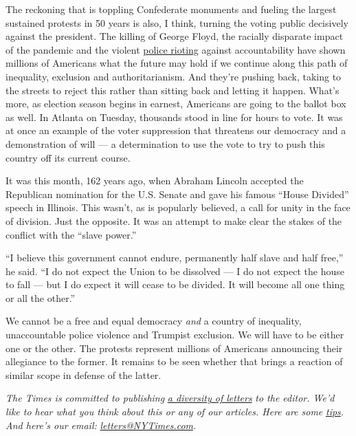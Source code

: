 The reckoning that is toppling Confederate monuments and fueling the
largest sustained protests in 50 years is also, I think, turning the
voting public decisively against the president. The killing of George
Floyd, the racially disparate impact of the pandemic and the violent
\href{https://www.nytimes3xbfgragh.onion/2020/06/05/opinion/sunday/police-riots.html}{police
rioting} against accountability have shown millions of Americans what
the future may hold if we continue along this path of inequality,
exclusion and authoritarianism. And they're pushing back, taking to the
streets to reject this rather than sitting back and letting it happen.
What's more, as election season begins in earnest, Americans are going
to the ballot box as well. In Atlanta on Tuesday, thousands stood in
line for hours to vote. It was at once an example of the voter
suppression that threatens our democracy and a demonstration of will ---
a determination to use the vote to try to push this country off its
current course.

It was this month, 162 years ago, when Abraham Lincoln accepted the
Republican nomination for the U.S. Senate and gave his famous ``House
Divided'' speech in Illinois. This wasn't, as is popularly believed, a
call for unity in the face of division. Just the opposite. It was an
attempt to make clear the stakes of the conflict with the ``slave
power.''

``I believe this government cannot endure, permanently half slave and
half free,'' he said. ``I do not expect the Union to be dissolved --- I
do not expect the house to fall --- but I do expect it will cease to be
divided. It will become all one thing or all the other.''

We cannot be a free and equal democracy \emph{and} a country of
inequality, unaccountable police violence and Trumpist exclusion. We
will have to be either one or the other. The protests represent millions
of Americans announcing their allegiance to the former. It remains to be
seen whether that brings a reaction of similar scope in defense of the
latter.

\emph{The Times is committed to publishing}
\href{https://www.nytimes3xbfgragh.onion/2019/01/31/opinion/letters/letters-to-editor-new-york-times-women.html}{\emph{a
diversity of letters}} \emph{to the editor. We'd like to hear what you
think about this or any of our articles. Here are some}
\href{https://help.nytimes3xbfgragh.onion/hc/en-us/articles/115014925288-How-to-submit-a-letter-to-the-editor}{\emph{tips}}\emph{.
And here's our email:}
\href{mailto:letters@NYTimes.com}{\emph{letters@NYTimes.com}}\emph{.}

